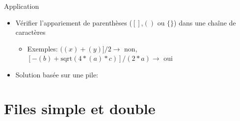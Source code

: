 \begin{frame}{Application}
\begin{itemize}
\item Vérifier l'appariement de parenthèses ($[]$,$()$ ou $\{\}$) dans une chaîne de caractères
\begin{itemize}
\item Exemples: $((x)+(y)]/2\rightarrow$ non, $[- (b) + \mbox{sqrt}(4*(a)*c)]/ (2*a) \rightarrow$ oui
\end{itemize}
\item Solution basée sur une pile:
\begin{center}
\begin{small}
\end{small}
\end{center}
\end{itemize}
\end{frame}

\section{Files simple et double}

